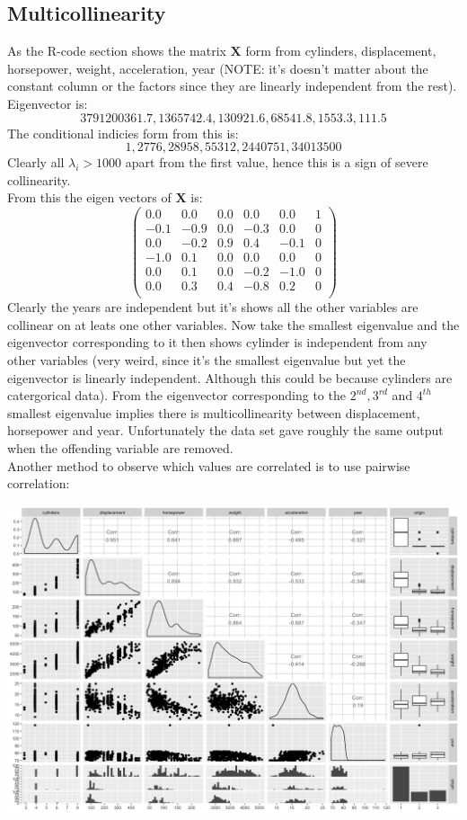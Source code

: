 \documentclass[11pt]{article} %
\begin{document}
\subsection{Multicollinearity}
As the R-code section shows the matrix $\pmb{X}$ form from cylinders, displacement, horsepower, weight, acceleration, year (NOTE: it's doesn't matter about the constant column or the factors since they are linearly independent from the rest).\\ 
Eigenvector is:
$$
3791200361.7,1365742.4,130921.6,68541.8,1553.3,111.5
$$
The conditional indicies form from this is:
$$
 1,2776,28958,55312,2440751,34013500
$$
Clearly all $\lambda_i>1000$ apart from the first value, hence this is a sign of severe collinearity.\\
From this the eigen vectors of $\pmb{X}$ is:
$$
\begin{pmatrix}
0.0&0.0&0.0&0.0&0.0&1\\
-0.1&-0.9&0.0&-0.3&0.0&0\\
0.0&-0.2&0.9&0.4&-0.1&0\\
-1.0&0.1&0.0&0.0&0.0&0\\
0.0&0.1&0.0&-0.2&-1.0&0\\
0.0&0.3&0.4&-0.8&0.2&0\\
\end{pmatrix}
$$
Clearly the years are independent but it's shows all the other variables are collinear on at leats one other variables. Now take the smallest eigenvalue and the eigenvector corresponding to it then shows cylinder is independent from any other variables (very weird, since it's the smallest eigenvalue but yet the eigenvector is linearly independent. Although this could be because cylinders are catergorical data). From the eigenvector corresponding to the $2^{nd},3^{rd}$ and $4^{th}$ smallest eigenvalue implies there is multicollinearity between displacement, horsepower and year. Unfortunately the data set gave roughly the same output when the offending variable are removed.\\
Another method to observe which values are correlated is to use pairwise correlation:
\begin{center}
\includegraphics[scale=0.3]{pair_cor}
\end{center}
\end{document}
